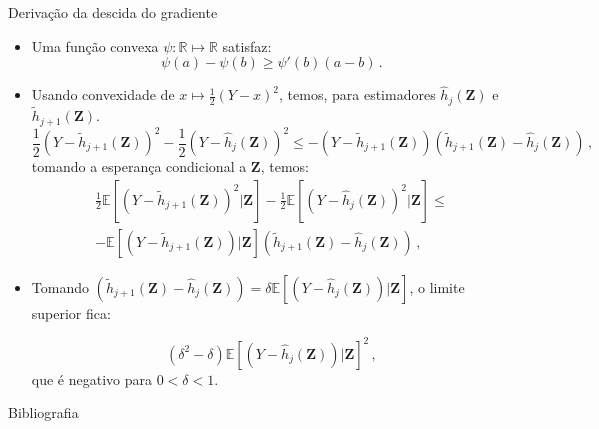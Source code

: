 \documentclass[11pt]{beamer}
\begin{document}
	\appendix
	
	\begin{frame}{Derivação da descida do gradiente}
		\label{grad_desc}
		\begin{itemize}
			\item Uma função convexa $\psi:\mathbb{R}\mapsto \mathbb{R}$ satisfaz:
			$$\psi(a)-\psi(b)\geq \psi'(b)(a-b)\, .$$
			\item Usando convexidade de $x \mapsto \frac{1}{2}(Y-x)^2$, temos, para estimadores $\hat{h}_j(\boldsymbol{Z})$ e $\tilde{h}_{j+1}(\boldsymbol{Z})$.
			$$\frac{1}{2} (Y- \tilde{h}_{j+1}(\boldsymbol{Z}))^2 - \frac{1}{2}(Y- \hat{h}_{j}(\boldsymbol{Z}))^2 \leq - (Y- \tilde{h}_{j+1}(\boldsymbol{Z}))(\tilde{h}_{j+1}(\boldsymbol{Z}) - \hat{h}_{j}(\boldsymbol{Z}))\, ,   $$
			tomando a esperança condicional a $\boldsymbol{Z}$, temos:
			\begin{equation*}
				\begin{aligned}
							\frac{1}{2} \mathbb{E}[(Y- \tilde{h}_{j+1}(\boldsymbol{Z}))^2|\boldsymbol{Z}] - \frac{1}{2}\mathbb{E}[(Y- \hat{h}_{j}(\boldsymbol{Z}))^2|\boldsymbol{Z}] \leq \\ 
							-\mathbb{E}[(Y- \tilde{h}_{j+1}(\boldsymbol{Z}))|\boldsymbol{Z}](\tilde{h}_{j+1}(\boldsymbol{Z}) - \hat{h}_{j}(\boldsymbol{Z}))\, , 
				\end{aligned}
			\end{equation*}
			\item Tomando $ (\tilde{h}_{j+1}(\boldsymbol{Z}) - \hat{h}_{j}(\boldsymbol{Z})) = \delta \mathbb{E}[(Y- \hat{h}_{j}(\boldsymbol{Z}))|\boldsymbol{Z}]$, o limite superior fica:
			
			$$(\delta^2 -\delta )\mathbb{E}[(Y- \hat{h}_{j}(\boldsymbol{Z}))|\boldsymbol{Z}]^2 \, ,$$
			que é negativo para $0 < \delta < 1$.	\hyperlink{boosting}{}
		
		\end{itemize}
	\end{frame}
		\begin{frame}[allowframebreaks]{Bibliografia}
	\printbibliography

	\end{frame}
\end{document}
